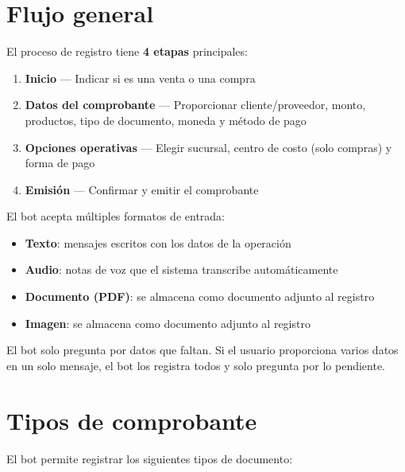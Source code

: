 \documentclass[12pt,a4paper]{article}
\begin{document}
\section{Flujo general}

El proceso de registro tiene \textbf{4 etapas} principales:

\begin{enumerate}[label=\textbf{Etapa \arabic*:}, leftmargin=3.5cm]
    \item \textbf{Inicio} --- Indicar si es una venta o una compra
    \item \textbf{Datos del comprobante} --- Proporcionar cliente/proveedor, monto, productos, tipo de documento, moneda y m\'etodo de pago
    \item \textbf{Opciones operativas} --- Elegir sucursal, centro de costo (solo compras) y forma de pago
    \item \textbf{Emisi\'on} --- Confirmar y emitir el comprobante
\end{enumerate}

El bot acepta m\'ultiples formatos de entrada:

\begin{itemize}
    \item \textbf{Texto}: mensajes escritos con los datos de la operaci\'on
    \item \textbf{Audio}: notas de voz que el sistema transcribe autom\'aticamente
    \item \textbf{Documento (PDF)}: se almacena como documento adjunto al registro
    \item \textbf{Imagen}: se almacena como documento adjunto al registro
\end{itemize}

El bot solo pregunta por datos que faltan. Si el usuario proporciona varios datos en un solo mensaje, el bot los registra todos y solo pregunta por lo pendiente.

\section{Tipos de comprobante}

El bot permite registrar los siguientes tipos de documento:
\end{document}
